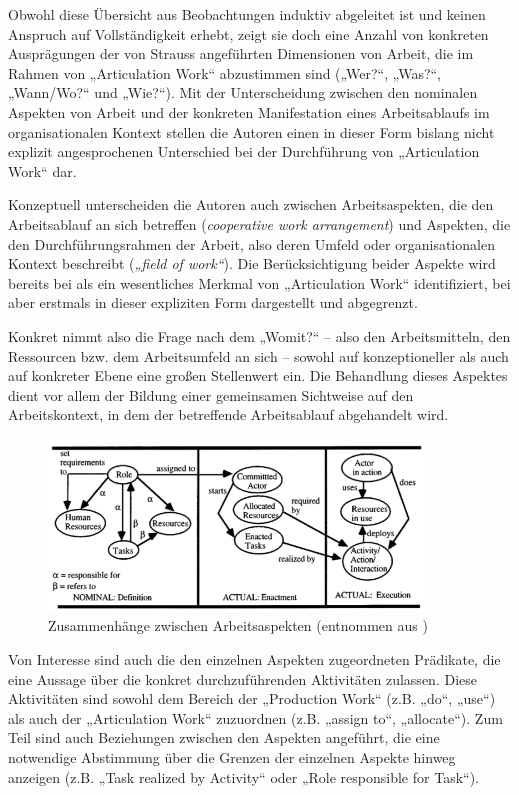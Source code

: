 Obwohl diese Übersicht aus Beobachtungen induktiv abgeleitet ist und keinen Anspruch auf Vollständigkeit erhebt, zeigt sie doch eine Anzahl von konkreten Ausprägungen der von Strauss angeführten Dimensionen von Arbeit, die im Rahmen von „Articulation Work“ abzustimmen sind („Wer?“, „Was?“, „Wann/Wo?“ und „Wie?“). Mit der Unterscheidung zwischen den nominalen Aspekten von Arbeit und der konkreten Manifestation eines Arbeitsablaufs im organisationalen Kontext stellen die Autoren einen in dieser Form bislang nicht explizit angesprochenen Unterschied bei der Durchführung von „Articulation Work“ dar.

Konzeptuell unterscheiden die Autoren auch zwischen Arbeitsaspekten, die den Arbeitsablauf an sich betreffen (\emph{cooperative work arrangement}) und Aspekten, die den Durchführungsrahmen der Arbeit, also deren Umfeld oder organisationalen Kontext beschreibt (\emph{„field of work“}). Die Berücksichtigung beider Aspekte wird bereits bei \citet{Strauss88} als ein wesentliches Merkmal von „Articulation Work“ identifiziert, bei \citet{Schmidt96} aber erstmals in dieser expliziten Form dargestellt und abgegrenzt.

Konkret nimmt also die Frage nach dem „Womit?“ -- also den Arbeitsmitteln, den Ressourcen bzw. dem Arbeitsumfeld an sich --  sowohl auf konzeptioneller als auch auf konkreter Ebene eine großen Stellenwert ein. Die Behandlung dieses Aspektes dient vor allem der Bildung einer gemeinsamen Sichtweise auf den Arbeitskontext, in dem der betreffende Arbeitsablauf abgehandelt wird.

\begin{figure}[htbp]
	\centering
		\includegraphics[width=10cm]{img/ArticulationWork/divitini00_caw.png}
	\caption[Zusammenhänge zwischen Arbeitsaspekten]{Zusammenhänge zwischen Arbeitsaspekten (entnommen aus \citep{Divitini00})}
	\label{fig:img_ArticulationWork_divitini00_caw}
\end{figure}

Von Interesse sind auch die den einzelnen Aspekten zugeordneten Prädikate, die eine Aussage über die konkret durchzuführenden Aktivitäten zulassen. Diese Aktivitäten sind sowohl dem Bereich der „Production Work“ (z.B. „do“, „use“) als auch der „Articulation Work“ zuzuordnen (z.B. „assign to“, „allocate“). Zum Teil sind auch Beziehungen zwischen den Aspekten angeführt, die eine notwendige Abstimmung über die Grenzen der einzelnen Aspekte hinweg anzeigen (z.B. „Task realized by Activity“ oder „Role responsible for Task“).

